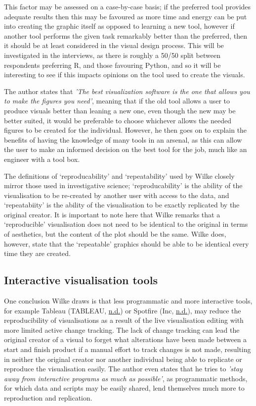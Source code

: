 \documentclass[
  11pt,
]{book}
\begin{document}
This factor may be assessed on a case-by-case basis; if the preferred
tool provides adequate results then this may be favoured as more time
and energy can be put into creating the graphic itself as opposed to
learning a new tool, however if another tool performs the given task
remarkably better than the preferred, then it should be at least
considered in the visual design process. This will be investigated in
the interviews, as there is roughly a 50/50 split between respondents
preferring R, and those favouring Python, and so it will be interesting
to see if this impacts opinions on the tool used to create the visuals.

The author states that
\textit{'The best visualization software is the one that allows you to make the figures you need'},
meaning that if the old tool allows a user to produce visuals better
than leaning a new one, even though the new may be better suited, it
would be preferable to choose whichever allows the needed figures to be
created for the individual. However, he then goes on to explain the
benefits of having the knowledge of many tools in an arsenal, as this
can allow the user to make an informed decision on the best tool for the
job, much like an engineer with a tool box.

The definitions of `reproducability' and `repeatability' used by Wilke
closely mirror those used in investigative science; `reproducability' is
the ability of the visualisation to be re-created by another user with
access to the data, and `repeatabiity' is the ability of the
visualisation to be exactly replicated by the original creator. It is
important to note here that Wilke remarks that a `reproducible'
visualisation does not need to be identical to the original in terms of
aesthetics, but the content of the plot should be the same. Wilke does,
however, state that the `repeatable' graphics should be able to be
identical every time they are created.

\subsection{Interactive visualisation tools}

One conclusion Wilke draws is that less programmatic and more
interactive tools, for example Tableau (TABLEAU,
\protect\hyperlink{ref-tableau}{n.d.}) or Spotfire (Inc,
\protect\hyperlink{ref-spotfire}{n.d.}), may reduce the reproducibility
of visualisations as a result of the live visualisation editing with
more limited active change tracking. The lack of change tracking can
lead the original creator of a visual to forget what alterations have
been made between a start and finish product if a manual effort to track
changes is not made, resulting in neither the original creator nor
another individual being able to replicate or reproduce the
visualisation easily. The author even states that he tries to
\textit{'stay away from interactive programs as much as possible'}, as
programmatic methods, for which data and scripts may be easily shared,
lend themselves much more to reproduction and replication.
\end{document}
